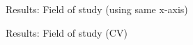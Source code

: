 \documentclass[11pt, aspectratio=169]{beamer}
\begin{document}
\begin{frame}{Results: Field of study (using same x-axis)}
    \centering
\end{frame}

\begin{frame}{Results: Field of study (CV)}
    \centering
\end{frame}
\end{document}
